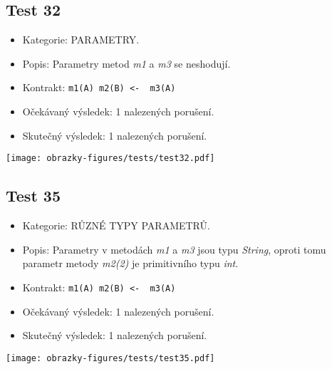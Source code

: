 \subsection*{Test 32}
\begin{itemize}
\item Kategorie: PARAMETRY.
\item Popis: Parametry metod \textit{m1} a \textit{m3} se neshodují. 
\item Kontrakt: \texttt{m1(A) m2(B) <- { m3(A) }}
\item Očekávaný výsledek: 1 nalezených porušení.
\item Skutečný výsledek: 1 nalezených porušení.
\end{itemize}
\begin{center}
    \centering
    \texttt{[image: obrazky-figures/tests/test32.pdf]}
    \label{test32}
\end{center}

\subsection*{Test 35}
\begin{itemize}
\item Kategorie: RŮZNÉ TYPY PARAMETRŮ.
\item Popis: Parametry v metodách \textit{m1} a \textit{m3} jsou typu \textit{String}, oproti tomu parametr metody \textit{m2(2)} je primitivního typu \textit{int}. 
\item Kontrakt: \texttt{m1(A) m2(B) <- { m3(A) }}
\item Očekávaný výsledek: 1 nalezených porušení.

\item Skutečný výsledek: 1 nalezených porušení.
\end{itemize}
\begin{center}
    \centering
    \texttt{[image: obrazky-figures/tests/test35.pdf]}
    \label{test35}
\end{center}

